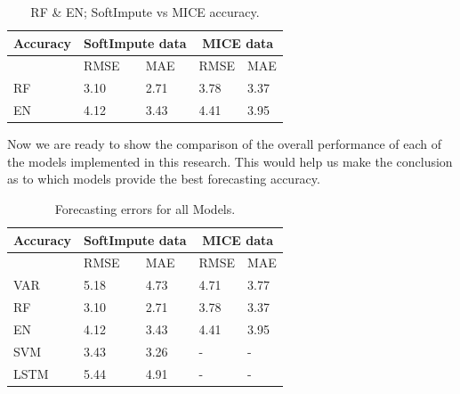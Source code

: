 \documentclass[12pt,italian, twoside]{report}
\begin{document}
\begin{enumerate}
		 \begin{table}
			\centering
			\begin{tabular}{|l|l|l|l|l|}
				\hline
				Accuracy &\multicolumn{2}{c|}{SoftImpute data } &\multicolumn{2}{c|}{MICE data } \\ \hline
				&   RMSE & MAE               & RMSE & MAE \\
				RF             &    3.10              &  2.71    &  3.78   &  3.37 \\
				EN             &     4.12              & 3.43   &  4.41    & 3.95 \\  \hline
			\end{tabular}
			\caption{RF \& EN; SoftImpute vs MICE accuracy.}
			\label{tab:RF_EN_soft_mice}
		\end{table}
		
		Now we are ready to show the comparison of the overall performance of each of the models implemented in this research. This would help us make the conclusion as to which models provide the best forecasting accuracy.\\
		 \begin{table}
			\centering
			\begin{tabular}{|l|l|l|l|l|}
				\hline
				Accuracy &\multicolumn{2}{c|}{SoftImpute data } &\multicolumn{2}{c|}{MICE data } \\ \hline
				&   RMSE &         MAE      & RMSE & MAE \\
				VAR           &    5.18            &   4.73    &   4.71  &3.77  \\
				RF             &    3.10              &  2.71    &  3.78   &  3.37 \\
				EN             &     4.12              & 3.43   &  4.41    & 3.95 \\ 
				SVM          &       3.43            & 3.26    &     -         &   -       \\
				LSTM         &       5.44           &  4.91        &    -           &     -      \\ \hline
			\end{tabular}
			\caption{Forecasting errors for all Models.}
			\label{tab:all_MODELS}
		\end{table}

\end{enumerate}
\end{document}
